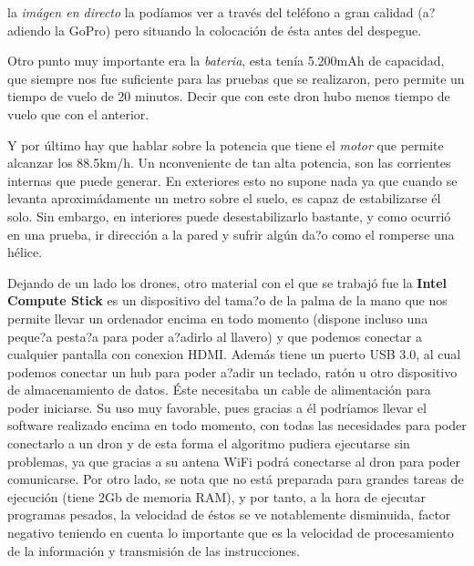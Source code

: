 \documentclass{report}
\begin{document}
\hspace{1 cm} la \textsl{im\'agen en directo} la pod\'iamos ver a trav\'es del tel\'efono a gran calidad (a?adiendo la GoPro) pero situando la colocaci\'on de \'esta antes del despegue.

\hspace{1 cm} Otro punto muy importante era la \textsl{bateria}, esta ten\'ia  5.200mAh de capacidad, que siempre nos fue suficiente para las pruebas que se realizaron, pero permite un tiempo de vuelo de 20 minutos. Decir que con este dron hubo menos tiempo de vuelo que con el anterior.

\hspace{1 cm} Y por \'ultimo hay que hablar sobre la potencia que tiene el \textsl{motor} que permite alcanzar los 88.5km/h. Un nconveniente de tan alta potencia, son las corrientes internas que puede generar. En exteriores esto no supone nada ya que cuando se levanta aproxim\'adamente un metro sobre el suelo, es capaz de estabilizarse \'el solo. Sin embargo, en interiores puede desestabilizarlo bastante, y como ocurri\'o en una prueba, ir direcci\'on a la pared y sufrir alg\'un da?o como el romperse una h\'elice.


\hspace{1 cm} Dejando de un lado los drones, otro material con el que se trabaj\'o fue la \textbf{Intel Compute Stick} es un dispositivo del tama?o de la palma de la mano que nos permite llevar un ordenador encima en todo momento (dispone incluso una peque?a pesta?a para poder a?adirlo al llavero) y que podemos conectar a cualquier pantalla con conexion HDMI. Adem\'as tiene un puerto USB 3.0, al cual podemos conectar un hub para poder a?adir un teclado, rat\'on u otro dispositivo de almacenamiento de datos. \'Este necesitaba un cable de alimentaci\'on para poder iniciarse. Su uso muy favorable, pues gracias a \'el podr\'iamos llevar el software realizado encima en todo momento, con todas las necesidades para poder conectarlo a un dron y de esta forma el algoritmo pudiera ejecutarse sin problemas, ya que gracias a su antena WiFi podr\'a conectarse al dron para poder comunicarse. Por otro lado, se nota que no est\'a preparada para grandes tareas de ejecuci\'on (tiene 2Gb de memoria RAM), y por tanto, a la hora de ejecutar programas pesados, la velocidad de \'estos se ve notablemente disminuida, factor negativo teniendo en cuenta lo importante que es la velocidad de procesamiento de la informaci\'on y transmisi\'on de las instrucciones. 
\end{document}
